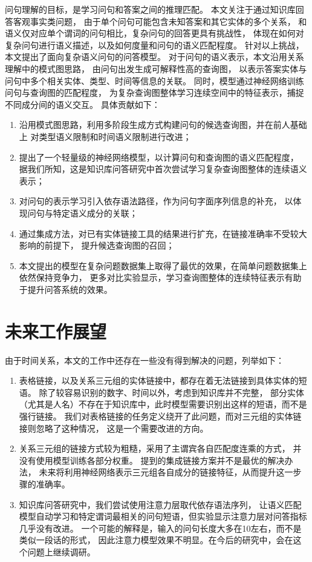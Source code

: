 问句理解的目标，是学习问句和答案之间的推理匹配。
本文关注于通过知识库回答客观事实类问题，
由于单个问句可能包含未知答案和其它实体的多个关系，
和语义仅对应单个谓词的问句相比，复杂问句的回答更具有挑战性，
体现在如何对复杂问句进行语义描述，以及如何度量和问句的语义匹配程度。
针对以上挑战，本文提出了面向复杂语义问句的问答模型。
对于问句的语义表示，本文沿用关系理解中的模式图思路，
由问句出发生成可解释性高的查询图，
以表示答案实体与问句中多个相关实体、类型、时间等信息的关联。
同时，模型通过神经网络训练问句与查询图的匹配程度，
为复杂查询图整体学习连续空间中的特征表示，捕捉不同成分间的语义交互。
具体贡献如下：
\begin{enumerate}
\item{沿用模式图思路，利用多阶段生成方式构建问句的候选查询图，并在前人基础上
对类型语义限制和时间语义限制进行改进；}
\item{提出了一个轻量级的神经网络模型，以计算问句和查询图的语义匹配程度，
据我们所知，这是知识库问答研究中首次尝试学习复杂查询图整体的连续语义表示；}
\item{对问句的表示学习引入依存语法路径，作为问句字面序列信息的补充，
以体现问句与特定语义成分的关联；}
\item{通过集成方法，对已有实体链接工具的结果进行扩充，在链接准确率不受较大影响的前提下，
提升候选查询图的召回；}
\item{本文提出的模型在复杂问题数据集上取得了最优的效果，在简单问题数据集上依然保持竞争力，
更多对比实验显示，学习查询图整体的连续特征表示有助于提升问答系统的效果。}
\end{enumerate}


\section{未来工作展望}

由于时间关系，本文的工作中还存在一些没有得到解决的问题，列举如下：

\begin{enumerate}
\item{表格链接，以及关系三元组的实体链接中，都存在着无法链接到具体实体的短语。
除了较容易识别的数字、时间以外，考虑到知识库并不完整，
部分实体（尤其是人名）不存在于知识库中，此时模型需要识别出这样的短语，而不是强行链接。
我们对表格链接的任务定义绕开了此问题，而对三元组的实体链接则忽略了这种情况，
这是一个需要改进的方向。}
\item{关系三元组的链接方式较为粗糙，采用了主谓宾各自匹配度连乘的方式，
并没有使用模型训练各部分权重。
提到的集成链接方案并不是最优的解决办法，
未来将利用神经网络表示三元组各自成分的链接特征，从而提升这一步骤的准确率。}
\item{知识库问答研究中，我们尝试使用注意力层\cite{bahdanau2014neural}取代依存语法序列，
让语义匹配模型自动学习和特定谓词最相关的问句短语，但实验显示注意力层对问答指标几乎没有改进。
一个可能的解释是，输入的问句长度大多在10左右，而不是类似一段话的形式，
因此注意力模型效果不明显。在今后的研究中，会在这个问题上继续调研。}
\end{enumerate}

